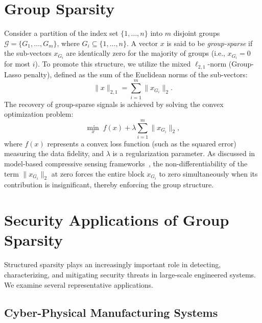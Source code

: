 \documentclass[12pt]{article}
\begin{document}
\section{Group Sparsity}

Consider a partition of the index set $\{1,\dots,n\}$ into $m$ disjoint groups $\mathcal{G} = \{G_1, \dots, G_m\}$, where $G_i \subseteq \{1,\dots,n\}$.
A vector $x$ is said to be \textit{group-sparse} if the sub-vectors $x_{G_i}$ are identically zero for the majority of groups (i.e., $x_{G_i} = 0$ for most $i$).
To promote this structure, we utilize the mixed $\ell_{2,1}$-norm (Group-Lasso penalty), defined as the sum of the Euclidean norms of the sub-vectors:
\[
\|x\|_{2,1} = \sum_{i=1}^m \|x_{G_i}\|_2.
\]
The recovery of group-sparse signals is achieved by solving the convex optimization problem:
\[
\min_{x} \; f(x) + \lambda \sum_{i=1}^m \|x_{G_i}\|_2,
\]
where $f(x)$ represents a convex loss function (such as the squared error) measuring the data fidelity, and $\lambda$ is a regularization parameter. As discussed in model-based compressive sensing frameworks~\cite{Baraniuk}, the non-differentiability of the term $\|x_{G_i}\|_2$ at zero forces the entire block $x_{G_i}$ to zero simultaneously when its contribution is insignificant, thereby enforcing the group structure.

\section{Security Applications of Group Sparsity}

Structured sparsity plays an increasingly important role in detecting, characterizing, and mitigating security threats in large-scale engineered systems. We examine several representative applications.

\subsection{Cyber-Physical Manufacturing Systems}
\end{document}
